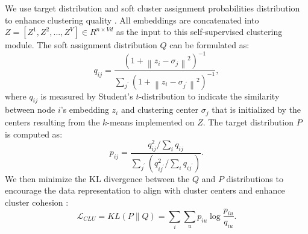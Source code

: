\documentclass[letterpaper]{article} %
\begin{document}
We use target distribution and soft cluster assignment probabilities distribution to enhance clustering quality \cite{tu2021deep}. All embeddings are concatenated into $Z = [Z^1, Z^2,..., Z^V]\in R^{n\times Vd}$ as the input to this self-supervised clustering module.
The soft assignment distribution $Q$ can be formulated as:
\begin{equation}\label{soft assignment}
    q_{i j}=\frac{{\left(1+\left\|z_i-\sigma_j\right\|^2\right)}^{-1}}{\sum_{j^{\prime}}\left(1+\left\|z_i-\sigma_{j^{\prime}}\right\|^2\right)^{-1}},
\end{equation}
where $q_{i j}$ is measured by Student's $t$-distribution to indicate the similarity between node $i$'s embedding $z_i$ and clustering center $\sigma_j$ that is initialized by the centers resulting from the $k$-means implemented on $Z$.
The target distribution $P$ is computed as:
\begin{equation}\label{target distribution}
    p_{i j}=\frac{q_{i j}^2 / \sum_i q_{i j}}{\sum_{j^{\prime}}\left(q_{i j^{\prime}}^2 / \sum_i q_{i j^{\prime}}\right)}.
\end{equation}
We then minimize the KL divergence between the $Q$ and $P$ distributions to encourage the data representation to align with cluster centers and enhance cluster cohesion \cite{kullback1951information}:
\begin{equation}\label{loss: clu}
    \mathcal{L}_{C L U}=K L(P \| Q)=\sum_i \sum_u p_{i u} \log \frac{p_{i u}}{q_{i u}}.
\end{equation}
\end{document}
